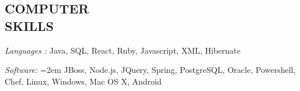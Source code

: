 \documentclass[12pt, line, margin]{res}
\begin{document}

\address{
}

\begin{resume}


\section{COMPUTER \\ SKILLS} {\sl Languages :} Java, SQL, React, Ruby, Javascript, XML, Hibernate

               {\sl Software:}  
			\hangindent=2em
			JBoss, Node.js, JQuery, Spring, PostgreSQL, Oracle, \newline Powershell, Chef, Linux, Windows, Mac OS X, Android
			

\end{resume}
\end{document}

